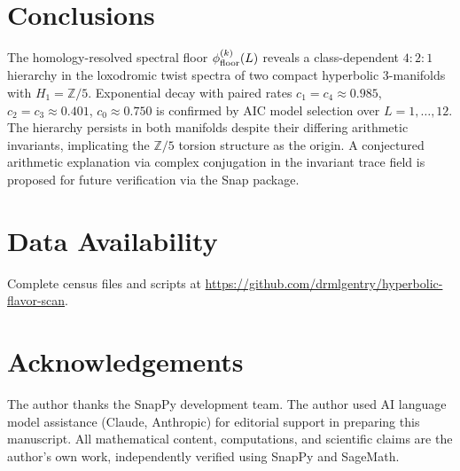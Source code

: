 \documentclass[11pt,a4paper]{article}
\theoremstyle{remark}
\newcommand{\Zfive}{\mathbb{Z}/5}
\begin{document}
\section{Conclusions}
\label{sec:concl}

The homology-resolved spectral floor $\phi_{\rm floor}^{(k)}(L)$
reveals a class-dependent $4{:}2{:}1$ hierarchy in the loxodromic
twist spectra of two compact hyperbolic 3-manifolds with $H_1=\Zfive$.
Exponential decay with paired rates $c_1=c_4\approx 0.985$,
$c_2=c_3\approx 0.401$, $c_0\approx 0.750$ is confirmed by AIC
model selection over $L=1,\ldots,12$.
The hierarchy persists in both manifolds despite their differing
arithmetic invariants, implicating the $\Zfive$ torsion structure
as the origin.
A conjectured arithmetic explanation via complex conjugation in
the invariant trace field is proposed for future verification
via the Snap package.

\section*{Data Availability}
Complete census files and scripts at
\url{https://github.com/drmlgentry/hyperbolic-flavor-scan}.

\section*{Acknowledgements}
The author thanks the SnapPy development team.
The author used AI language model assistance (Claude, Anthropic) for
editorial support in preparing this manuscript. All mathematical content,
computations, and scientific claims are the author's own work,
independently verified using SnapPy and SageMath.
\end{document}
